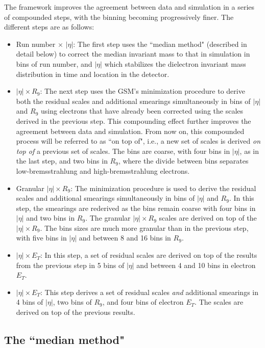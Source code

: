 The framework improves the agreement between data and simulation in a series of compounded steps, with the binning becoming progressively finer. The different steps are as follows:

\begin{itemize}
    \item Run number $\times$ $|\eta|$: The first step uses the ``median method" (described in detail below) to correct the median invariant mass to that in simulation in bins of run number, and $|\eta|$ which stabilizes the dielectron invariant mass distribution in time and location in the detector.
    \item $|\eta| \times R_9$: The next step uses the GSM's minimization procedure to derive both the residual scales and additional smearings simultaneously in bins of $|\eta|$ and $R_9$ using electrons that have already been corrected using the scales derived in the previous step. This compounding effect further improves the agreement between data and simulation. From now on, this compounded process will be referred to as ``on top of", i.e., a new set of scales is derived \textit{on top of} a previous set of scales. The bins are coarse, with four bins in $|\eta|$, as in the last step, and two bins in $R_9$, where the divide between bins separates low-bremsstrahlung and high-bremsstrahlung electrons.  
    \item Granular $|\eta| \times R_9$: The minimization procedure is used to derive the residual scales and additional smearings simultaneously in bins of $|\eta|$ and $R_9$. In this step, the smearings are rederived as the bins remain coarse with four bins in $|\eta|$ and two bins in $R_9$. The granular $|\eta| \times R_9$ scales are derived on top of the $|\eta| \times R_9$. The bins sizes are much more granular than in the previous step, with five bins in $|\eta|$ and between 8 and 16 bins in $R_9$.
    \item $|\eta| \times E_T$: In this step, a set of residual scales are derived on top of the results from the previous step in 5 bins of $|\eta|$ and between 4 and 10 bins in electron $E_T$. 
    \item $|\eta| \times E_T$: This step derives a set of residual scales \textit{and} additional smearings in 4 bins of $|\eta|$, two bins of $R_9$, and four bins of electron $E_T$. The scales are derived on top of the previous results.
    
\end{itemize}

\subsection{The ``median method"}

